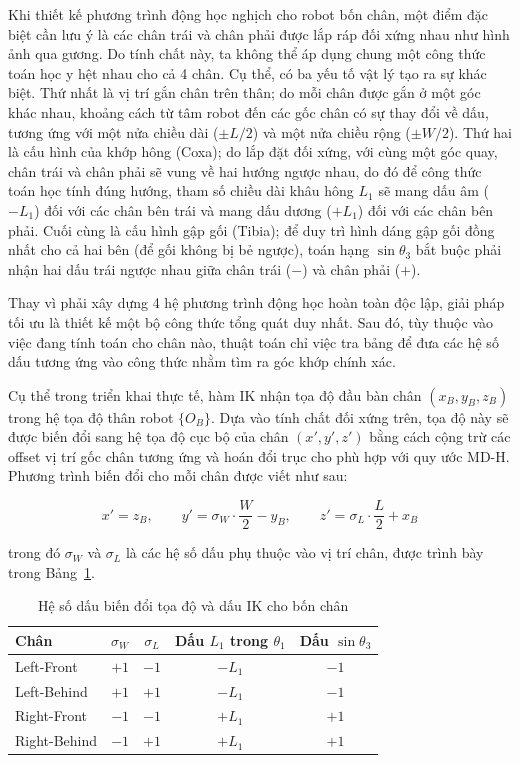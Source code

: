 Khi thiết kế phương trình động học nghịch cho robot bốn chân, một điểm đặc biệt cần lưu ý là các chân trái và chân phải được lắp ráp đối xứng nhau như hình ảnh qua gương. Do tính chất này, ta không thể áp dụng chung một công thức toán học y hệt nhau cho cả 4 chân. Cụ thể, có ba yếu tố vật lý tạo ra sự khác biệt. Thứ nhất là vị trí gắn chân trên thân; do mỗi chân được gắn ở một góc khác nhau, khoảng cách từ tâm robot đến các gốc chân có sự thay đổi về dấu, tương ứng với một nửa chiều dài ($\pm L/2$) và một nửa chiều rộng ($\pm W/2$). Thứ hai là cấu hình của khớp hông (Coxa); do lắp đặt đối xứng, với cùng một góc quay, chân trái và chân phải sẽ vung về hai hướng ngược nhau, do đó để công thức toán học tính đúng hướng, tham số chiều dài khâu hông $L_1$ sẽ mang dấu âm ($-L_1$) đối với các chân bên trái và mang dấu dương ($+L_1$) đối với các chân bên phải. Cuối cùng là cấu hình gập gối (Tibia); để duy trì hình dáng gập gối đồng nhất cho cả hai bên (để gối không bị bẻ ngược), toán hạng $\sin\theta_3$ bắt buộc phải nhận hai dấu trái ngược nhau giữa chân trái ($-$) và chân phải ($+$).

Thay vì phải xây dựng 4 hệ phương trình động học hoàn toàn độc lập, giải pháp tối ưu là thiết kế một bộ công thức tổng quát duy nhất. Sau đó, tùy thuộc vào việc đang tính toán cho chân nào, thuật toán chỉ việc tra bảng để đưa các hệ số dấu tương ứng vào công thức nhằm tìm ra góc khớp chính xác.

Cụ thể trong triển khai thực tế, hàm IK nhận tọa độ đầu bàn chân $(x_B, y_B, z_B)$ trong hệ tọa độ thân robot $\{O_B\}$. Dựa vào tính chất đối xứng trên, tọa độ này sẽ được biến đổi sang hệ tọa độ cục bộ của chân $(x', y', z')$ bằng cách cộng trừ các offset vị trí gốc chân tương ứng và hoán đổi trục cho phù hợp với quy ước MD-H. Phương trình biến đổi cho mỗi chân được viết như sau:

\begin{equation}
x' = z_B, \qquad
y' = \sigma_W \cdot \frac{W}{2} - y_B, \qquad
z' = \sigma_L \cdot \frac{L}{2} + x_B
\label{eq:body_to_leg}
\end{equation}

trong đó $\sigma_W$ và $\sigma_L$ là các hệ số dấu phụ thuộc vào vị trí chân, được trình bày trong Bảng~\ref{tab:ik_signs}.

\begin{table}[h]
\centering
\caption{Hệ số dấu biến đổi tọa độ và dấu IK cho bốn chân}
\label{tab:ik_signs}
\renewcommand{\arraystretch}{1.3}
\begin{tabular}{|l|c|c|c|c|}
\hline
\textbf{Chân} & $\sigma_W$ & $\sigma_L$ & Dấu $L_1$ trong $\theta_1$ & Dấu $\sin\theta_3$ \\ \hline
Left-Front  & $+1$ & $-1$ & $-L_1$ & $-1$ \\ \hline
Left-Behind & $+1$ & $+1$ & $-L_1$ & $-1$ \\ \hline
Right-Front & $-1$ & $-1$ & $+L_1$ & $+1$ \\ \hline
Right-Behind & $-1$ & $+1$ & $+L_1$ & $+1$ \\ \hline
\end{tabular}
\end{table}

